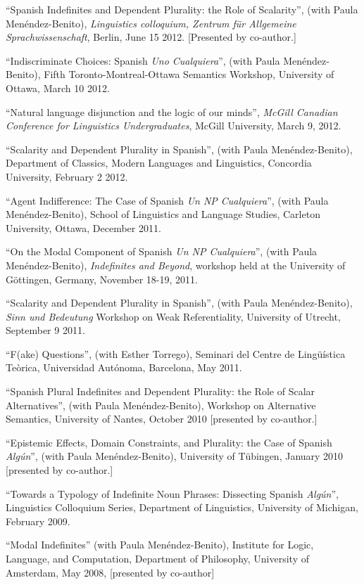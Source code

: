\documentclass[11pt]{article}
\begin{document}
``Spanish Indefinites and Dependent Plurality: the Role of
Scalarity'',  (with Paula Men\'endez-Benito), \textit{Linguistics colloquium, Zentrum f\"{u}r
  Allgemeine Sprachwissenschaft}, Berlin, June 15 2012. [Presented by co-author.]

``Indiscriminate Choices: Spanish \textit{Uno
  Cualquiera}'', (with Paula Men\'endez-Benito), Fifth Toronto-Montreal-Ottawa Semantics Workshop, University of
Ottawa, March 10 2012.

``Natural language disjunction and the logic of our
minds'', \textit{McGill Canadian Conference for Linguistics
  Undergraduates}, McGill University, March 9, 2012.

``Scalarity and Dependent Plurality in Spanish'', (with Paula Men\'endez-Benito),
Department of Classics, Modern Languages and Linguistics, Concordia
University, February 2 2012.

``Agent Indifference: The Case of Spanish \textit{Un NP
  Cualquiera}'', (with Paula Men\'endez-Benito), School of Linguistics and Language Studies, Carleton
University, Ottawa, December 2011. 

``On the Modal Component of Spanish \textit{Un NP
  Cualquiera}'', (with Paula Men\'endez-Benito), \textit{Indefinites
  and Beyond}, workshop held at the University of G\"{o}ttingen,
Germany, November 18-19, 2011.

``Scalarity and Dependent Plurality in Spanish'',
(with Paula Men\'endez-Benito), \textit{Sinn und Bedeutung} Workshop
on Weak Referentiality, University of Utrecht, September 9 2011.

``F(ake) Questions'', (with Esther Torrego), Seminari del
Centre de Ling\"{u}\'istica Te\`orica, Universidad Aut\'onoma, Barcelona, May 2011. 

``Spanish Plural Indefinites and Dependent Plurality:
the Role of Scalar Alternatives'', (with Paula Men\'endez-Benito),
Workshop on Alternative Semantics, University of Nantes, October 2010 [presented by co-author.]

``Epistemic Effects, Domain Constraints, and Plurality: the Case
of Spanish \textit{Alg\'un}'', (with Paula Men\'endez-Benito),
University of T\"ubingen, January 2010 [presented by co-author.]


``Towards a Typology of Indefinite Noun Phrases: Dissecting Spanish \textit{Alg\'un}'', Linguistics Colloquium Series, Department of Linguistics, University of Michigan, February 2009. 

``Modal Indefinites'' (with Paula Men\'endez-Benito),  Institute for Logic, Language, and Computation, Department of Philosophy, University of
  Amsterdam, May 2008, [presented by co-author]
\end{document}
